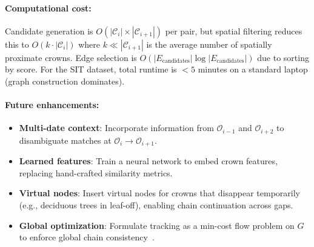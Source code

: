 \paragraph{Computational cost:} Candidate generation is $O(|\mathcal{C}_i| \times |\mathcal{C}_{i+1}|)$ per pair, but spatial filtering reduces this to $O(k \cdot |\mathcal{C}_i|)$ where $k \ll |\mathcal{C}_{i+1}|$ is the average number of spatially proximate crowns. Edge selection is $O(|E_{\text{candidates}}| \log |E_{\text{candidates}}|)$ due to sorting by score. For the SIT dataset, total runtime is $<5$ minutes on a standard laptop (graph construction dominates).

\paragraph{Future enhancements:}
\begin{itemize}
    \item \textbf{Multi-date context}: Incorporate information from $\mathcal{O}_{i-1}$ and $\mathcal{O}_{i+2}$ to disambiguate matches at $\mathcal{O}_i \to \mathcal{O}_{i+1}$.
    \item \textbf{Learned features}: Train a neural network to embed crown features, replacing hand-crafted similarity metrics.
    \item \textbf{Virtual nodes}: Insert virtual nodes for crowns that disappear temporarily (e.g., deciduous trees in leaf-off), enabling chain continuation across gaps.
    \item \textbf{Global optimization}: Formulate tracking as a min-cost flow problem on $G$ to enforce global chain consistency~\cite{zhang2008global}.
\end{itemize}
